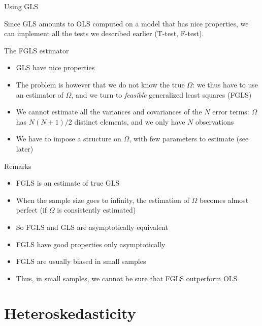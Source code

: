 \documentclass[aspectratio=169]{beamer}
\begin{document}
\begin{frame}{Using GLS}

Since GLS amounts to OLS computed on a model that has nice properties, we can implement all the tests we described earlier (T-test, F-test).

\end{frame}

\begin{frame}{The FGLS estimator}

\begin{itemize}
    \item GLS have nice properties
    \item The problem is however that we do not know the true $\Omega$: we thus have to use an estimator of $\Omega$, and we turn to \textit{feasible} generalized least squares (FGLS)
    \item We cannot estimate all the variances and covariances of the $N$ error terms: $\Omega$ has $N(N+1)/2$ distinct elements, and we only have $N$ observations
    \item We have to impose a structure on $\Omega$, with few parameters to estimate (see later)
\end{itemize}

\end{frame}

\begin{frame}{Remarks}

\begin{itemize}
    \item FGLS is an estimate of true GLS
    \item When the sample size goes to infinity, the estimation of $\Omega$ becomes almost perfect (if $\Omega$ is consistently estimated)
    \item So FGLS and GLS are asymptotically equivalent
    \item FGLS have good properties only asymptotically
    \item FGLS are usually biased in small samples
    \item Thus, in small samples, we cannot be sure that FGLS outperform OLS
\end{itemize}

\end{frame}

\section{Heteroskedasticity}
\end{document}
